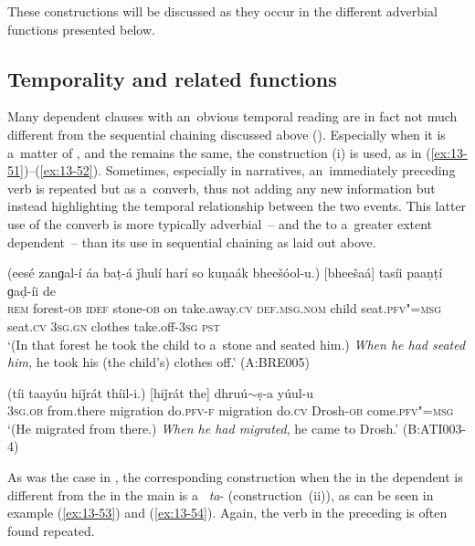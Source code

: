 These constructions will be discussed as they occur in the different adverbial functions presented below. 


\subsection{Temporality and related functions}
\label{subsec:13-4-1}

 Many dependent clauses with an~obvious temporal reading are in fact not much different from the sequential chaining discussed above (). Especially when it is a~matter of , and the  remains the same, the  construction (i) is used, as in (\ref{ex:13-51})--(\ref{ex:13-52}). Sometimes, especially in narratives, an~immediately preceding  verb is repeated but as a~converb, thus not adding any new information but instead highlighting the temporal relationship between the two events. This latter use of the converb is more typically adverbial~-- and the   to a~greater extent dependent~-- than its use in sequential chaining as laid out above.

\begin{exe}
\ex
\label{ex:13-51}
\gll (eesé zanɡal-í áa baṭ-á ǰhulí harí so kuṇaák bheešóol-u.) [bheešaá] tasíi paaṇṭí ɡaḍ-íi de \\
\textsc{rem} forest-\textsc{ob} \textsc{idef} stone-\textsc{ob} on take.away.\textsc{cv}   \textsc{def.msg.nom} child seat.\textsc{pfv"=msg} seat.\textsc{cv} \textsc{3sg.gn} clothes take.off-\textsc{3sg} \textsc{pst} \\
\glt `(In that forest he took the child to a~stone and seated him.) \textit{When he had seated him,} he took his (the child's) clothes off.' (A:BRE005)

\ex
\label{ex:13-52}
\gll (tíi taayúu hiǰrát thíil-i.) [hiǰrát the] dhruú$\sim$ṣ-a yúul-u \\
\textsc{3sg.ob} from.there migration do.\textsc{pfv-f}    migration do.\textsc{cv} Drosh-\textsc{ob} come.\textsc{pfv"=msg} \\
\glt `(He migrated from there.) \textit{When he had migrated}, he came to Drosh.' (B:ATI003-4) 
\end{exe}

As was the case in , the corresponding construction when the  in the dependent
 is different from the  in the main  is a~ \textit{ta}-
(construction~(ii)), as can be seen in example (\ref{ex:13-53}) and (\ref{ex:13-54}). Again, the verb in the preceding   is often found repeated.

